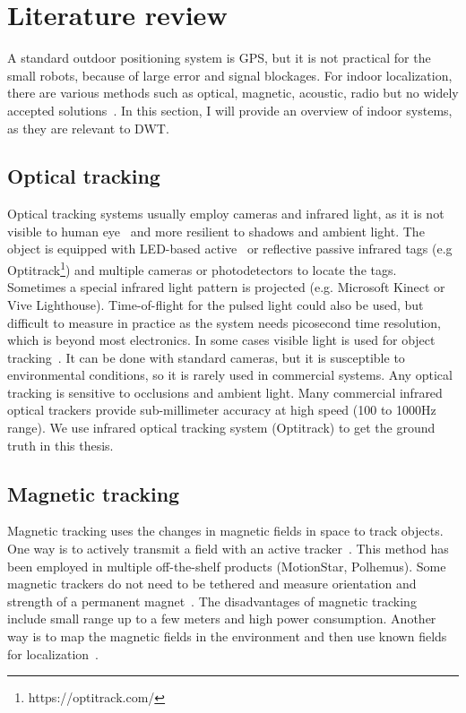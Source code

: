 \section{Literature review}
A standard outdoor positioning system is GPS, but it is not practical for the small robots, because of large error and signal blockages. For indoor localization, there are various methods such as optical, magnetic, acoustic, radio but no widely accepted solutions~\cite{welch2002motion,hightower2001location}. In this section, I will provide an overview of indoor systems, as they are relevant to DWT.  

\subsection{Optical tracking}
 Optical tracking systems usually employ cameras and infrared light, as it is not visible to human eye~\cite{mautz2011survey} and more resilient to shadows and ambient light.  The object is equipped with LED-based active~\cite{jung2011tdoa,want1992active} or reflective passive infrared tags (e.g Optitrack\footnote{https://optitrack.com/}) and multiple cameras or photodetectors to locate the tags. Sometimes a special infrared light pattern is projected (e.g. Microsoft Kinect or Vive Lighthouse). Time-of-flight for the pulsed light could also be used, but difficult to measure in practice as the system needs picosecond time resolution, which is beyond most electronics.
In some cases visible light is used for object tracking~\cite{kulkarni2005senseye}. It can be done with standard cameras, but it is susceptible to environmental conditions, so it is rarely used in commercial systems. Any optical tracking is sensitive to occlusions and ambient light. Many commercial infrared optical trackers provide sub-millimeter accuracy at high speed (100 to 1000Hz range). We use infrared optical tracking system (Optitrack) to get the ground truth in this thesis. 
 
\subsection{Magnetic tracking}
Magnetic tracking uses the changes in magnetic fields in space to track objects. One way is to actively transmit a field with an active tracker~\cite{raab1979magnetic}. This method has been employed in multiple off-the-shelf products (MotionStar, Polhemus). Some magnetic trackers do not need to be tethered and measure orientation and strength of a permanent magnet~\cite{hu2010cubic,liang2013gaussbits}. The disadvantages of magnetic tracking include small range up to a few meters and high power consumption.
Another way is to map the magnetic fields in the environment and then use known fields for localization~\cite{gozick2011magnetic}.


